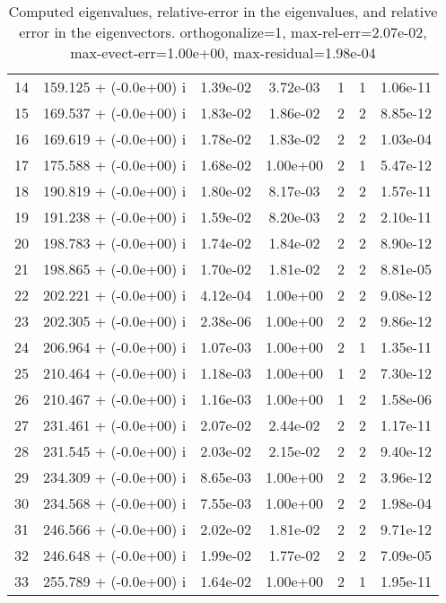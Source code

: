 \begin{table}[H]
\begin{center}
\begin{tabular}{|c|c|c|c|c|c|c|}
    14  &    159.125 + (-0.0e+00) i  &    1.39e-02      &   3.72e-03    &   1    &  1   &    1.06e-11 \\
    15  &    169.537 + (-0.0e+00) i  &    1.83e-02      &   1.86e-02    &   2    &  2   &    8.85e-12 \\
    16  &    169.619 + (-0.0e+00) i  &    1.78e-02      &   1.83e-02    &   2    &  2   &    1.03e-04 \\
    17  &    175.588 + (-0.0e+00) i  &    1.68e-02      &   1.00e+00    &   2    &  1   &    5.47e-12 \\
    18  &    190.819 + (-0.0e+00) i  &    1.80e-02      &   8.17e-03    &   2    &  2   &    1.57e-11 \\
    19  &    191.238 + (-0.0e+00) i  &    1.59e-02      &   8.20e-03    &   2    &  2   &    2.10e-11 \\
    20  &    198.783 + (-0.0e+00) i  &    1.74e-02      &   1.84e-02    &   2    &  2   &    8.90e-12 \\
    21  &    198.865 + (-0.0e+00) i  &    1.70e-02      &   1.81e-02    &   2    &  2   &    8.81e-05 \\
    22  &    202.221 + (-0.0e+00) i  &    4.12e-04      &   1.00e+00    &   2    &  2   &    9.08e-12 \\
    23  &    202.305 + (-0.0e+00) i  &    2.38e-06      &   1.00e+00    &   2    &  2   &    9.86e-12 \\
    24  &    206.964 + (-0.0e+00) i  &    1.07e-03      &   1.00e+00    &   2    &  1   &    1.35e-11 \\
    25  &    210.464 + (-0.0e+00) i  &    1.18e-03      &   1.00e+00    &   1    &  2   &    7.30e-12 \\
    26  &    210.467 + (-0.0e+00) i  &    1.16e-03      &   1.00e+00    &   1    &  2   &    1.58e-06 \\
    27  &    231.461 + (-0.0e+00) i  &    2.07e-02      &   2.44e-02    &   2    &  2   &    1.17e-11 \\
    28  &    231.545 + (-0.0e+00) i  &    2.03e-02      &   2.15e-02    &   2    &  2   &    9.40e-12 \\
    29  &    234.309 + (-0.0e+00) i  &    8.65e-03      &   1.00e+00    &   2    &  2   &    3.96e-12 \\
    30  &    234.568 + (-0.0e+00) i  &    7.55e-03      &   1.00e+00    &   2    &  2   &    1.98e-04 \\
    31  &    246.566 + (-0.0e+00) i  &    2.02e-02      &   1.81e-02    &   2    &  2   &    9.71e-12 \\
    32  &    246.648 + (-0.0e+00) i  &    1.99e-02      &   1.77e-02    &   2    &  2   &    7.09e-05 \\
    33  &    255.789 + (-0.0e+00) i  &    1.64e-02      &   1.00e+00    &   2    &  1   &    1.95e-11 \\
\hline
\end{tabular}
\caption{Computed eigenvalues, relative-error in the eigenvalues, and relative error in the eigenvectors. orthogonalize=1, max-rel-err=2.07e-02, max-evect-err=1.00e+00, max-residual=1.98e-04
}\label{table:genEigspipeze2.order2.hdf}
\end{center}
\end{table}
